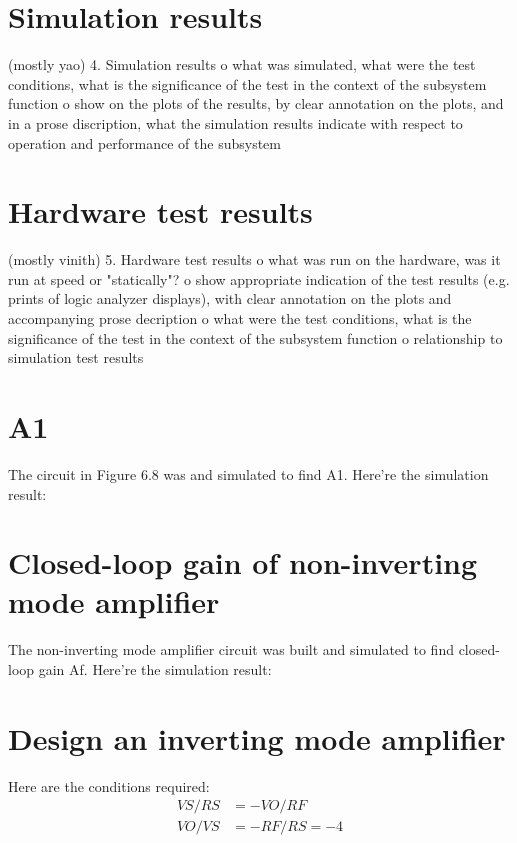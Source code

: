 \documentclass[letterpaper]{article} %
\begin{document}
\section{Simulation results}
(mostly yao)
	4.  Simulation results
         o  what was simulated, what were the test conditions, what is the
            significance of the test in the context of the subsystem function
         o  show on the plots of the results, by clear annotation on the plots,
            and in a prose discription, what the simulation results indicate with
            respect to operation and performance of the subsystem

\section{Hardware test results}
(mostly vinith)
    5.  Hardware test results
         o  what was run on the hardware, was it run at speed or "statically"?
         o  show appropriate indication of the test results (e.g. prints of
            logic analyzer displays), with clear annotation on the plots and
            accompanying prose decription
         o  what were the test conditions, what is the significance of the test
            in the context of the subsystem function
         o  relationship to simulation test results






\section{A1}
The circuit in Figure 6.8 was and simulated to find A1. Here're the simulation result:

\begin{minipage}{1.0\textwidth}
\centering
{}
\centering
\end{minipage}
\bigskip

\section{Closed-loop gain of non-inverting mode amplifier}

The non-inverting mode amplifier circuit was built and simulated to find closed-loop gain Af. Here're the simulation result:


\section{Design an inverting mode amplifier}

Here are the conditions required:
\begin{align*}
VS/RS&=-VO/RF\\
VO/VS&=-RF/RS=-4\\
\end{align*}
\end{document}
